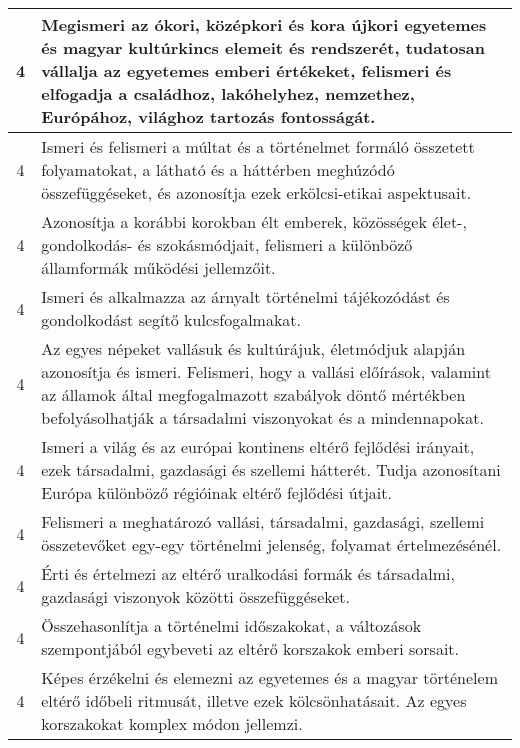 \begin{longtable}{c | p{12cm} }
                                
                                          4 &  Megismeri az ókori, középkori és kora újkori egyetemes és magyar kultúrkincs elemeit és rendszerét, tudatosan vállalja az egyetemes emberi értékeket, felismeri és elfogadja a családhoz, lakóhelyhez, nemzethez, Európához, világhoz tartozás fontosságát. \\ \hline
                                          4 &  Ismeri és felismeri a múltat és a történelmet formáló összetett folyamatokat, a látható és a háttérben meghúzódó összefüggéseket, és azonosítja ezek erkölcsi-etikai aspektusait. \\ \hline
                                          4 &  Azonosítja a korábbi korokban élt emberek, közösségek élet-, gondolkodás- és szokásmódjait, felismeri a különböző államformák működési jellemzőit. \\ \hline
                                          4 &  Ismeri és alkalmazza az árnyalt történelmi tájékozódást és gondolkodást segítő kulcsfogalmakat. \\ \hline
                                          4 &  Az egyes népeket vallásuk és kultúrájuk, életmódjuk alapján azonosítja és ismeri. Felismeri, hogy a vallási előírások, valamint az államok által megfogalmazott szabályok döntő mértékben befolyásolhatják a társadalmi viszonyokat és a mindennapokat. \\ \hline
                                          4 &  Ismeri a világ és az európai kontinens eltérő fejlődési irányait, ezek társadalmi, gazdasági és szellemi hátterét. Tudja azonosítani Európa különböző régióinak eltérő fejlődési útjait. \\ \hline
                                          4 &  Felismeri a meghatározó vallási, társadalmi, gazdasági, szellemi összetevőket egy-egy történelmi jelenség, folyamat értelmezésénél. \\ \hline
                                          4 &  Érti és értelmezi az eltérő uralkodási formák és társadalmi, gazdasági viszonyok közötti összefüggéseket. \\ \hline
                                          4 &  Összehasonlítja a történelmi időszakokat, a változások szempontjából egybeveti az eltérő korszakok emberi sorsait. \\ \hline
                                          4 &  Képes érzékelni és elemezni az egyetemes és a magyar történelem eltérő időbeli ritmusát, illetve ezek kölcsönhatásait. Az egyes korszakokat komplex módon jellemzi. \\ \hline
                                      
                        \end{longtable}
            \clearpage

